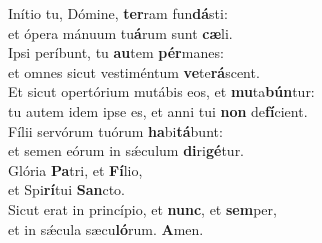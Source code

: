 \evenverse Inítio tu, Dómine, \textbf{ter}ram fun\textbf{dá}sti:~\*\\
\evenverse et ópera mánuum tu\textbf{á}rum sunt \textbf{cæ}li.\\
\oddverse Ipsi períbunt, tu \textbf{au}tem \textbf{pér}manes:~\*\\
\oddverse et omnes sicut vestiméntum \textbf{ve}te\textbf{rá}scent.\\
\evenverse Et sicut opertórium mutábis eos, et \textbf{mu}ta\textbf{bún}tur:~\*\\
\evenverse tu autem idem ipse es, et anni tui \textbf{non} de\textbf{fí}cient.\\
\oddverse Fílii servórum tuórum \textbf{ha}bi\textbf{tá}bunt:~\*\\
\oddverse et semen eórum in sǽculum \textbf{di}ri\textbf{gé}tur.\\
\evenverse Glória \textbf{Pa}tri, et \textbf{Fí}lio,~\*\\
\evenverse et Spi\textbf{rí}tui \textbf{San}cto.\\
\oddverse Sicut erat in princípio, et \textbf{nunc}, et \textbf{sem}per,~\*\\
\oddverse et in sǽcula sæcu\textbf{ló}rum. \textbf{A}men.\\
